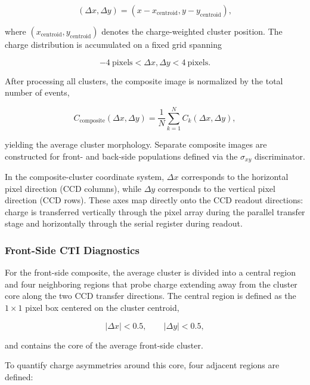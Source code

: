 \documentclass[11pt]{article}
\begin{document}
\begin{equation}
(\Delta x, \Delta y) = (x - x_{\mathrm{centroid}}, y - y_{\mathrm{centroid}}),
\end{equation}

where $(x_{\mathrm{centroid}}, y_{\mathrm{centroid}})$ denotes the charge-weighted cluster position. 
The charge distribution is accumulated on a fixed grid spanning

\begin{equation}
-4~\text{pixels} < \Delta x, \Delta y < 4~\text{pixels}.
\end{equation}

After processing all clusters, the composite image is normalized by the total number of events,

\begin{equation}
C_{\mathrm{composite}}(\Delta x, \Delta y)
=
\frac{1}{N}
\sum_{k=1}^{N}
C_k(\Delta x, \Delta y),
\end{equation}

yielding the average cluster morphology. 
Separate composite images are constructed for front- and back-side populations defined via the $\sigma_{xy}$ discriminator.

In the composite-cluster coordinate system, $\Delta x$ corresponds to the horizontal pixel direction (CCD columns), while $\Delta y$ corresponds to the vertical pixel direction (CCD rows). 
These axes map directly onto the CCD readout directions: charge is transferred vertically through the pixel array during the parallel transfer stage and horizontally through the serial register during readout.

\subsubsection*{Front-Side CTI Diagnostics}

For the front-side composite, the average cluster is divided into a central region and four neighboring regions that probe charge extending away from the cluster core along the two CCD transfer directions. 
The central region is defined as the $1\times1$ pixel box centered on the cluster centroid,

\begin{equation}
|\Delta x| < 0.5, \qquad |\Delta y| < 0.5,
\end{equation}

and contains the core of the average front-side cluster.

To quantify charge asymmetries around this core, four adjacent regions are defined:
\end{document}
